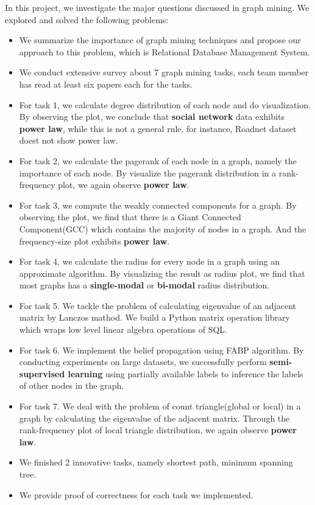 
In this project, we investigate the major questions discussed in graph mining. We 
explored and solved the following problems:

\begin{itemize}
    \item We summarize the importance of graph mining techniques and propose our approach
    to this problem, which is Relational Database Management System.
    \item We conduct extensive survey about 7 graph mining tasks, each team member has read
    at least six papers each for the tasks. 
    \item For task 1, we calculate degree distribution of each node and do visualization. By 
    observing the plot, we conclude that {\bf social network} data exhibits {\bf power law}, while
    this is not a general rule, for instance, Roadnet dataset doest not show power law.
    \item For task 2, we calculate the pagerank of each node in a graph, namely the importance of each
    node. By visualize the pagerank distribution in a rank-frequency plot, we again observe {\bf power law}.
    \item For task 3, we compute the weakly connected components for a graph. By observing the plot, we find
    that there is a Giant Connected Component(GCC) which contains the majority of nodes in a graph. And the frequency-size 
    plot exhibits {\bf power law}.
    \item For task 4, we calculate the radius for every node in a graph using an approximate algorithm.
    By visualizing the result as radius plot, we find that most graphs has a {\bf single-modal} or {\bf bi-modal} radius distribution. 
    \item For task 5. We tackle the problem of calculating eigenvalue of an adjacent matrix by Lanczos mathod. We 
    build a Python matrix operation library which wraps low level linear algebra operations of SQL. 
    \item For task 6. We implement the belief propagation using FABP algorithm. By conducting experiments on large datasets,
    we successfully perform {\bf semi-supervised learning} using partially available labels to inference the labels of other nodes in the graph. 
    \item For task 7. We deal with the problem of count triangle(global or local) in a graph by calculating the
    eigenvalue of the adjacent matrix. Through the rank-frequency plot of local triangle distribution, we again
    observe {\bf power law}.
    \item We finished 2 innovative tasks, namely shortest path, minimum spanning tree. 
    \item We provide proof of correctness for each task we implemented. 
\end{itemize}
